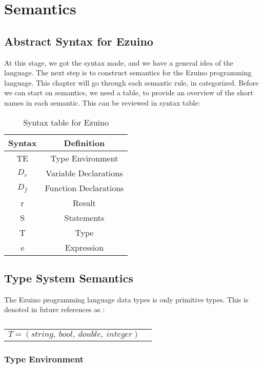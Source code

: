 \chapter{Semantics}
\label{semantics}
\section{Abstract Syntax for Ezuino}
At this stage, we got the syntax made, and we have a general idea of the language. The next step is to construct semantics for the Ezuino programming language. This chapter will go through each semantic rule, in categorized. 
Before we can start on semantics, we need a table, to provide an overview of the short names in each semantic. This can be  reviewed in syntax table: 
\begin{table}[H]
\centering
\label{syntax-table}
\caption{Syntax table for Ezuino}
\begin{tabular}{|c|c|}
\hline
\textbf{Syntax} & \textbf{Definition}   \\ \hline
TE              & Type Environment      \\ \hline
$D_v$           & Variable Declarations \\ \hline
$D_f$           & Function Declarations \\ \hline
r               & Result                \\ \hline
S               & Statements            \\ \hline
T               & Type                  \\ \hline
e               & Expression            \\ \hline
\end{tabular}
\end{table}

\section{Type System Semantics}
The Ezuino programming language data types is only primitive types. This is denoted in future references as :
\begin{table}[H]
    \centering
    \begin{longtable}[c] { r c }
      
        \( { T = (string,\ bool,\ double,\ integer)} \) \\
    \end{longtable}
    \caption{}\label{type:primitives}
\end{table}

\subsection{Type Environment}
